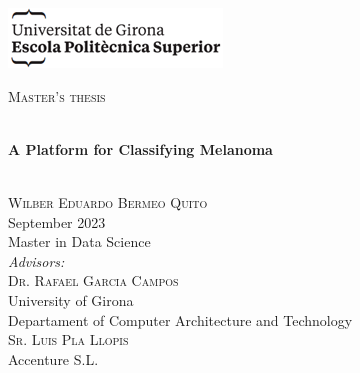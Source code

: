 \documentclass[a4paper,12pt,twoside]{ThesisStyle}
\begin{document}
\newpage
\hypersetup{pageanchor=false}
\begin{titlepage}

\includegraphics[scale=0.9]{imatges/logo_eps.png} \\[1cm]
\begin{center}
\textsc{\Large Master's thesis} \\[1cm]

\begin{spacing}{2}
\HRule \\
\textbf{\Huge A Platform for Classifying Melanoma} \\
\HRule \\[0.5cm]
\end{spacing}

{
\large
\textsc{Wilber Eduardo Bermeo Quito} \\
\small{September 2023} \\[0.75cm]
Master in Data Science \\[0.75cm]
\emph{Advisors:} \\[0.1cm]
\large
\textsc{Dr. Rafael Garcia Campos} \\
\small{University of Girona} \\
\small{Departament of Computer Architecture and Technology} \\[0.5cm]

\large
\textsc{Sr. Luis Pla Llopis} \\
\small{Accenture S.L.} \\

}

\end{center}
\end{titlepage}
\hypersetup{pageanchor=true}

\titlepage






%
%

\mainmatter





\backmatter






\end{document}
